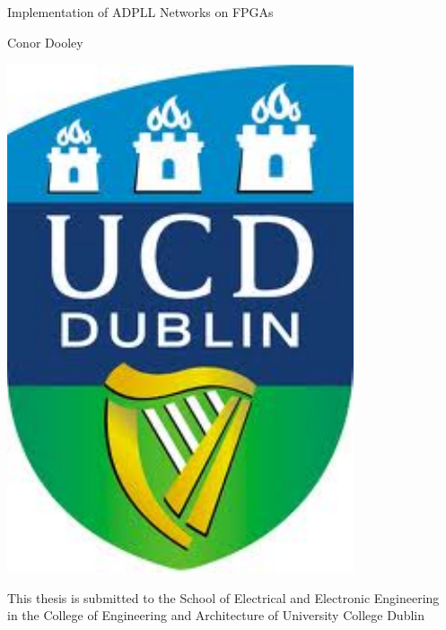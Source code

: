 \documentclass[11pt,british]{report}
\begin{document}
\begin{titlepage}
	\begin{spacing}{3}
		\noindent \begin{center}
		{\huge{}Implementation of ADPLL Networks on FPGAs}
		\par\end{center}{\huge \par}
	\end{spacing}
	\bigskip{}
	\begin{center}
		{\Large{}Conor Dooley}
	\end{center}
	\vspace{1.25cm}
	\begin{center}
		\includegraphics[width=0.2\paperwidth]{UCD_crest.pdf}\vspace{0.25cm}
	\end{center}
	\bigskip{}
	\begin{center}
		{\large{}This thesis is submitted to the School of Electrical and Electronic Engineering\\ \vspace{0.5cm}
		in the College of Engineering and Architecture of University College Dublin \\ \vspace{0.5cm}
}
\end{center}
\end{titlepage}
\end{document}

